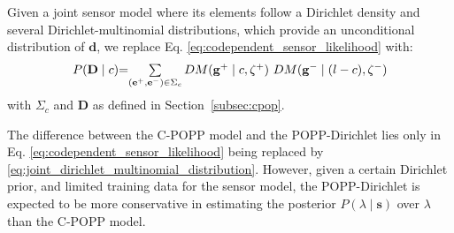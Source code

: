 Given a joint sensor model where its elements follow a Dirichlet density and several Dirichlet-multinomial distributions, which provide an unconditional distribution of $\mathbf{d}$, we replace Eq. \ref{eq:codependent_sensor_likelihood} with:  
\begin{equation}
	\label{eq:joint_dirichlet_multinomial_distribution}
    \begin{tabular}{r@{=}l}
		$P(\mathbf{D} \mid c)$ & $\sum\limits_{(\mathbf{e}^+, \mathbf{e}^-) \in \Sigma_c} DM(\mathbf{g}^+ \mid c, \mathbf{\zeta^+}) ~ DM(\mathbf{g}^- \mid (l - c), \mathbf{\zeta^-})$
	\end{tabular}
\end{equation}
\noindent with $\Sigma_c$ and $\mathbf{D}$ as defined in Section~\ref{subsec:cpop}.

The difference between the C-POPP model and the POPP-Dirichlet lies only in Eq. \ref{eq:codependent_sensor_likelihood} being replaced by \ref{eq:joint_dirichlet_multinomial_distribution}. However, given a certain Dirichlet prior, and limited training data for the sensor model, the POPP-Dirichlet is expected to be more conservative in estimating the posterior $P(\lambda \mid \mathbf{s})$ over $\lambda$ than the C-POPP model.

